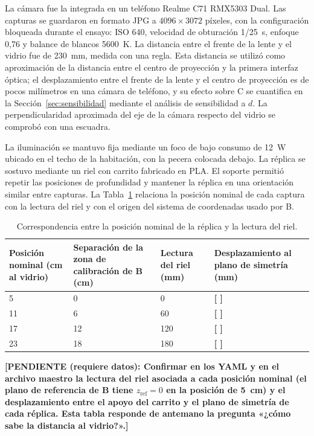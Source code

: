\documentclass{report}
\newcommand{\pendiente}[1]{\par\textbf{[PENDIENTE (requiere datos): #1]}\par}
\newcommand{\pend}[1]{\textbf{[#1]}}
\begin{document}
La cámara fue la integrada en un teléfono Realme C71 RMX5303 Dual. Las capturas se guardaron en formato JPG a $4096 \times 3072$ píxeles, con la configuración bloqueada durante el ensayo: ISO 640, velocidad de obturación 1/25~s, enfoque 0,76 y balance de blancos 5600~K. La distancia entre el frente de la lente y el vidrio fue de 230~mm, medida con una regla. Esta distancia se utilizó como aproximación de la distancia entre el centro de proyección y la primera interfaz óptica; el desplazamiento entre el frente de la lente y el centro de proyección es de pocos milímetros en una cámara de teléfono, y su efecto sobre C se cuantifica en la Sección~\ref{sec:sensibilidad} mediante el análisis de sensibilidad a $d$. La perpendicularidad aproximada del eje de la cámara respecto del vidrio se comprobó con una escuadra.

La iluminación se mantuvo fija mediante un foco de bajo consumo de 12~W ubicado en el techo de la habitación, con la pecera colocada debajo. La réplica se sostuvo mediante un riel con carrito fabricado en PLA. El soporte permitió repetir las posiciones de profundidad y mantener la réplica en una orientación similar entre capturas. La Tabla~\ref{tab:posiciones} relaciona la posición nominal de cada captura con la lectura del riel y con el origen del sistema de coordenadas usado por B.

\begin{table}[htbp]

\caption{Correspondencia entre la posición nominal de la réplica y la lectura del riel.}
\label{tab:posiciones}
\begin{tabular}{@{}p{2.8cm}p{3.4cm}p{2.6cm}p{3.4cm}@{}}
\hline
Posición nominal (cm al vidrio) & Separación de la zona de calibración de B (cm) & Lectura del riel (mm) & Desplazamiento al plano de simetría (mm) \\
\hline
5  & 0  & 0   & \pend{ } \\
11 & 6  & 60  & \pend{ } \\
17 & 12 & 120 & \pend{ } \\
23 & 18 & 180 & \pend{ } \\
\hline
\end{tabular}
\end{table}

\pendiente{Confirmar en los YAML y en el archivo maestro la lectura del riel asociada a cada posición nominal (el plano de referencia de B tiene $z_{\mathrm{ref}} = 0$ en la posición de 5~cm) y el desplazamiento entre el apoyo del carrito y el plano de simetría de cada réplica. Esta tabla responde de antemano la pregunta «¿cómo sabe la distancia al vidrio?».}
\end{document}

